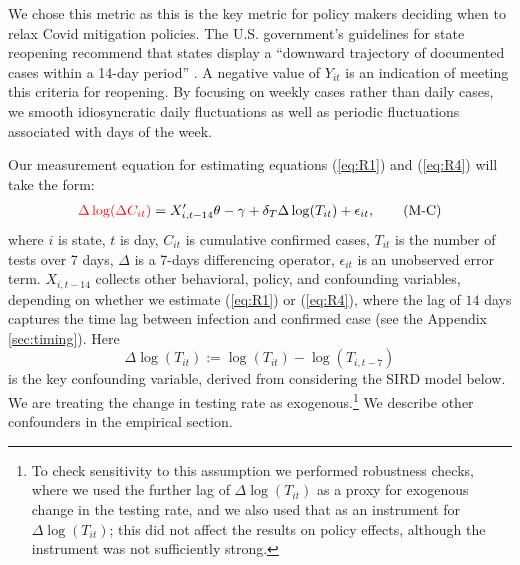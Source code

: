\documentclass[11pt,reqno,letter]{amsart}
\theoremstyle{definition}
\def\ycolor{\color{red}}
\begin{document}
We chose this metric as this is the key metric for policy makers deciding when to relax Covid mitigation policies.  The U.S. government's guidelines for state reopening
recommend that states display a
``downward trajectory of documented cases within a 14-day period''
\citep{whitehouse2020}. A negative value of
$Y_{it}$ is an indication of meeting this
criteria for reopening. By focusing on weekly cases  rather than daily cases, we smooth idiosyncratic daily fluctuations as well as periodic fluctuations associated with days of the week.

Our measurement equation for estimating equations (\ref{eq:R1}) and (\ref{eq:R4}) will take the form:
\begin{align}
{\ycolor \Delta \log(\Delta C_{it})}  =    X_{i,t-14} '   \theta  -\gamma +  \delta_T \Delta   \log(T_{it})  + \epsilon_{it},
 \label{eq:M} \tag{M-C}
\end{align}
where $i$ is state, $t$ is day, $C_{it}$ is cumulative confirmed
cases, $T_{it}$ is the number of tests over 7 days, $\Delta$ is
a 7-days differencing operator, $\epsilon_{it}$ is an unobserved error term.
 $X_{i,t-14}$  collects other behavioral, policy, and confounding variables, depending
on whether we estimate (\ref{eq:R1}) or (\ref{eq:R4}), where the lag of $14$ days captures the time lag between infection and confirmed case (see the Appendix \ref{sec:timing}). %
   Here
$$\Delta   \log(T_{it} ):=  \log(T_{it}) - \log(T_{i,t-7})  $$ %
is the key confounding variable,
derived from considering the SIRD model below. We are treating the change in testing
rate as exogenous.\footnote{To check sensitivity to this assumption
we performed robustness checks, where we used
the further lag of $\Delta   \log(T_{it} )$ as a proxy for exogenous change in the testing rate, and we also
used that as an instrument for $\Delta   \log(T_{it} )$; this did not affect the results on policy effects, although the instrument
was not sufficiently strong.} We describe other confounders in the empirical section.

\end{document}
